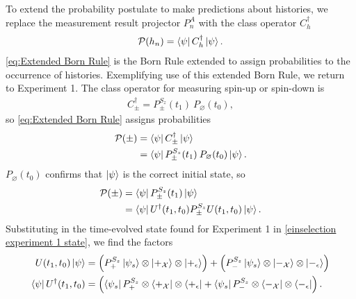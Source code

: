 To extend the probability postulate to make predictions about histories, we replace the measurement result projector $P^A_n$ with the class operator $C_h^\dagger$
\begin{align} \label{eq:Extended Born Rule}
  \mathcal{P}(h_n) = \bra{\psi} C_h^\dagger \ket{\psi}.
\end{align}
\autoref{eq:Extended Born Rule} is the Born Rule extended to assign probabilities to the occurrence of histories. Exemplifying use of this extended Born Rule, we return to Experiment 1. The class operator for measuring spin-up or spin-down is
\begin{align}
  C_\pm^\dagger = P^{S_z}_\pm (t_1) \: P_\varnothing (t_0),
\end{align}
so \autoref{eq:Extended Born Rule} assigns probabilities
\begin{align}
  \mathcal{P}(\pm) &= \bra{\psi} C_\pm^\dagger \ket{\psi} \\ \nonumber
  &= \bra{\psi} P^{S_z}_\pm (t_1) \: P_\varnothing (t_0) \ket{\psi}.
\end{align}
$P_\varnothing (t_0)$ confirms that $\ket{\psi}$ is the correct initial state, so
\begin{align}
  \mathcal{P}(\pm) &= \bra{\psi} P^{S_z}_\pm (t_1) \ket{\psi} \\ \nonumber
  &= \bra{\psi} U^\dagger(t_1, t_0) P^{S_z}_\pm U(t_1, t_0) \ket{\psi}.
\end{align}
Substituting in the time-evolved state found for Experiment 1 in \autoref{einselection experiment 1 state}, we find the factors
\begin{align}
  U(t_1, t_0) \ket{\psi} &= \left(P^{S_z}_+ \ket{\psi_s} \otimes \ket{+_\mathcal{X}} \otimes \ket{+_\epsilon}\right) + \left(P^{S_z}_- \ket{\psi_s} \otimes \ket{-_\mathcal{X}} \otimes \ket{-_\epsilon} \right)\\ \nonumber
  \bra{\psi} U^\dagger(t_1, t_0) &= \left(\bra{\psi_s}P^{S_z}_+ \otimes \bra{+_\mathcal{X}} \otimes \bra{+_\epsilon} + \bra{\psi_s}P^{S_z}_- \otimes \bra{-_\mathcal{X}} \otimes \bra{-_\epsilon}\right).
\end{align}

